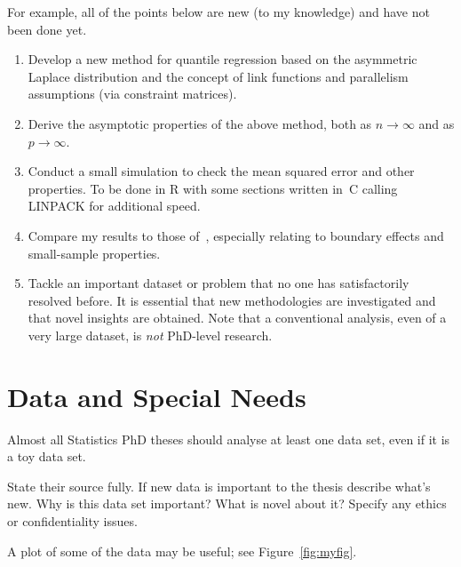 \documentclass[12pt,a4paper]{article}
\begin{document}
For example, all of the points below are new (to my knowledge)
and have not been done yet.
\begin{enumerate}

\item
Develop a new method for quantile regression based on the
asymmetric Laplace distribution and the concept of link functions
and parallelism assumptions (via constraint matrices).


\item
Derive the asymptotic properties of the above method,
both as $n \rightarrow \infty$ and as $p \rightarrow \infty$.




\item
Conduct a small simulation to check the mean squared error and
other properties. To be done in R with some sections written in~C
calling LINPACK \citep{dong:bunc:mole:stew:1979} for additional speed.



\item
Compare my results to those of~\cite{wei:carr:2009}, especially
relating to boundary effects and small-sample properties.



\item
Tackle an important dataset or problem that no one has
satisfactorily resolved before. It is essential that new
methodologies are investigated and that novel insights are
obtained. Note that a conventional analysis, even of a very large
dataset, is \textit{not} PhD-level research.


\end{enumerate}







\section{Data and Special Needs}
\label{sec:data}


Almost all Statistics PhD theses should analyse at least one
data set, even if it is a toy data set.


State their source fully.
If new data is important to the thesis describe what's new.
Why is this data set important?
What is novel about it?
Specify any ethics or confidentiality issues.


A plot of some of the data may be useful;
see Figure~\ref{fig:myfig}.
\end{document}
